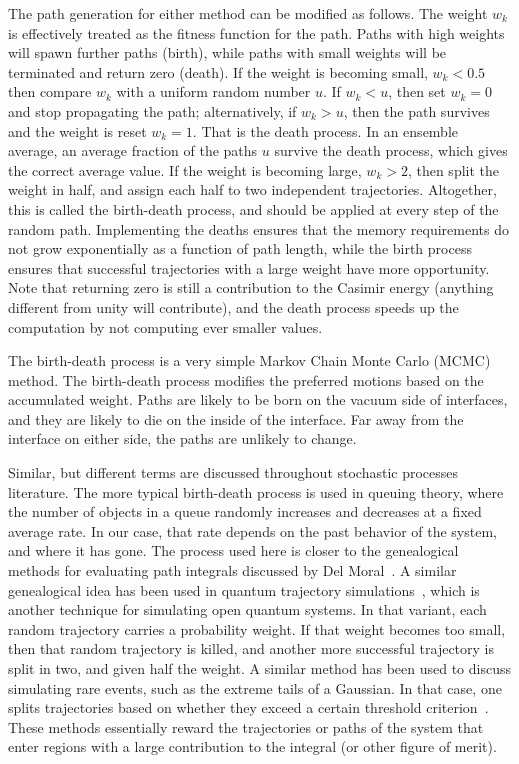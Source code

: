The path generation for either method can be modified as follows.  The weight $w_k$ is effectively treated as 
the fitness function for the path.  Paths with high weights will spawn further paths (birth), while paths with
small weights will be terminated and return zero (death).
If the weight is becoming small, $w_k<0.5$ then compare $w_k$ with a uniform random number $u$.
If $w_k<u$, then set $w_k=0$ and stop propagating the path; alternatively, if $w_k>u$, then 
the path survives and the weight is reset $w_k=1$.  That is the death process.
In an ensemble average, an average fraction of the paths $u$ survive the death process, which gives 
the correct average value.
If the weight is becoming large, $w_k>2$, then split the weight in half, and assign each half to 
two independent trajectories.
Altogether, this is called the birth-death process, and should be applied at every step of the random path.
Implementing the deaths ensures that the memory requirements do not grow exponentially as a function 
of path length, while the birth process ensures that successful trajectories with a large weight have 
more opportunity.  Note that returning zero is still a contribution to the Casimir energy (anything different
from unity will contribute), and the death process speeds up the computation by not computing ever smaller
values.

The birth-death process is a very simple Markov Chain Monte Carlo (MCMC) method.  The birth-death
process modifies the preferred motions based on the accumulated weight.  Paths are likely to be born
on the vacuum side of interfaces, and they are likely to die on the inside of the interface.
Far away from the interface on either side, the paths are unlikely to change.  

Similar, but different terms are discussed throughout stochastic processes literature.
The more typical birth-death process is used in queuing theory, where 
the number of objects in a queue randomly increases and decreases at a fixed average rate.
In our case, that rate depends on the past behavior of the system, and where it has gone.  
The process used here is closer to the genealogical methods for evaluating path integrals discussed by Del Moral~\cite{DelMoral2004}.
A similar genealogical idea has been used in quantum trajectory simulations~\cite{Jacobs2010a}, which is another
technique for simulating open quantum systems.  In that variant, each random trajectory carries 
a probability weight.  If that weight becomes too small, then that random trajectory is killed,
and another more successful trajectory is split in two, and given half the weight.   
A similar method has been used to discuss simulating rare events, such as the extreme tails of a Gaussian.
In that case, one splits trajectories based on whether they exceed a certain threshold criterion~\cite{Glasserman1999,Garvels2000}.
These methods essentially reward the trajectories or paths of the system that enter regions with a large
contribution to the integral (or other figure of merit).  

